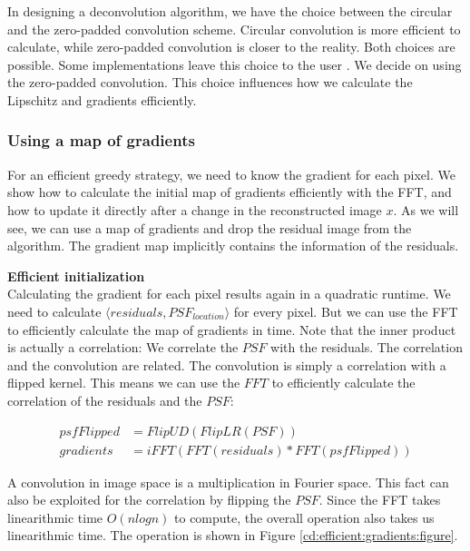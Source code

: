 In designing a deconvolution algorithm, we have the choice between the circular and the zero-padded convolution scheme. Circular convolution is more efficient to calculate, while zero-padded convolution is closer to the reality. Both choices are possible. Some implementations leave this choice to the user \cite{kenyon2019pymoresane}. We decide on using the zero-padded convolution. This choice influences how we calculate the Lipschitz and gradients efficiently.


\subsubsection{Using a map of gradients}
For an efficient greedy strategy, we need to know the gradient for each pixel.  We show how to calculate the initial map of gradients efficiently with the FFT, and how to update it directly after a change in the reconstructed image $x$. As we will see, we can use a map of gradients and drop the residual image from the algorithm. The gradient map implicitly contains the information of the residuals.

\textbf{Efficient initialization }\\
Calculating the gradient for each pixel results again in a quadratic runtime. We need to calculate $\langle residuals, PSF_{location} \rangle$ for every pixel. But we can use the FFT to efficiently calculate the map of gradients in time. Note that the inner product is actually a correlation: We correlate the $PSF$ with the residuals. The correlation and the convolution are related. The convolution is simply a correlation with a flipped kernel. This means we can use the $FFT$ to efficiently calculate the correlation of the residuals and the $PSF$:

\begin{equation}\label{cd:efficient:gradients:correlation}
\begin{split}
psfFlipped &= FlipUD(FlipLR(PSF)) \\
gradients &= iFFT(FFT(residuals) * FFT(psfFlipped))
\end{split}
\end{equation}

A convolution in image space is a multiplication in Fourier space. This fact can also be exploited for the correlation by flipping the $PSF$. Since the FFT takes linearithmic time $O(n log n)$ to compute, the overall operation also takes us linearithmic time. The operation is shown in Figure \ref{cd:efficient:gradients:figure}.

